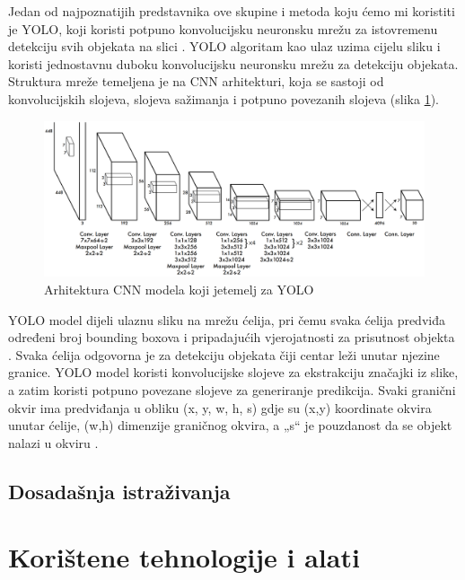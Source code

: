\documentclass[zavrsnirad]{fer}
\begin{document}
Jedan od najpoznatijih predstavnika ove skupine i metoda koju ćemo mi koristiti je YOLO, koji koristi potpuno konvolucijsku neuronsku mrežu za istovremenu detekciju svih objekata na slici \cite{v7labs_yolo_2023}. 
YOLO algoritam kao ulaz uzima cijelu sliku i koristi jednostavnu duboku konvolucijsku neuronsku mrežu za detekciju objekata.
Struktura mreže temeljena je na CNN arhitekturi, koja se sastoji od konvolucijskih slojeva, slojeva sažimanja i potpuno povezanih slojeva (slika \ref{fig:yolo_architecture}).
\begin{figure}[H]
  \centering
  \includegraphics[width=\linewidth]{Figures/Tiny_yolo_architechture.png}
  \caption{Arhitektura CNN modela koji jetemelj za YOLO \cite{v7labs_yolo_2023}}
  \label{fig:yolo_architecture}
\end{figure}
YOLO model dijeli ulaznu sliku na mrežu ćelija, pri čemu svaka ćelija predviđa određeni broj bounding boxova i pripadajućih vjerojatnosti za prisutnost objekta \cite{yolov3}.
Svaka ćelija odgovorna je za detekciju objekata čiji centar leži unutar njezine granice.
YOLO model koristi konvolucijske slojeve za ekstrakciju značajki iz slike, a zatim koristi potpuno povezane slojeve za generiranje predikcija\cite{v7labs_yolo_2023}.
Svaki granični okvir ima predviđanja u obliku (x, y, w, h, s) gdje su (x,y) koordinate okvira unutar ćelije, (w,h) dimenzije graničnog okvira, a „s“ je pouzdanost da se objekt nalazi u okviru \cite{nskturad}.

\section{Dosadašnja istraživanja}
\label{pog:dosadasnja_istrazivanja}

\chapter{Korištene tehnologije i alati}
\label{pog:korištene_tehnologije_i_alati}
\end{document}
